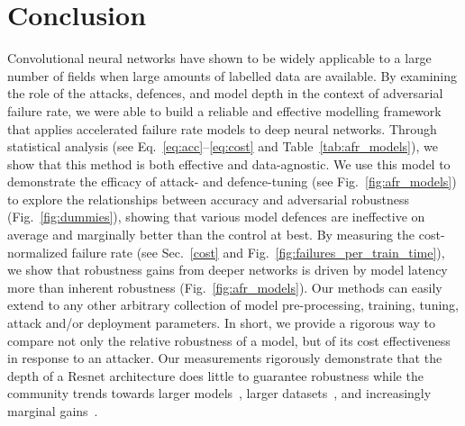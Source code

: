 \section{Conclusion}
Convolutional neural networks have shown to be widely applicable to a large number of fields when large amounts of labelled data are available. By examining the role of the attacks, defences, and model depth in the context of adversarial failure rate, we were able to build a reliable and effective modelling framework that applies accelerated failure rate models to deep neural networks. Through statistical analysis (see Eq.~\ref{eq:acc}--\ref{eq:cost} and Table~\ref{tab:afr_models}), we show that this method is both effective and data-agnostic.  We use this model to demonstrate the efficacy of attack- and defence-tuning (see Fig.~\ref{fig:afr_models}) to  explore the relationships between accuracy and adversarial robustness (Fig.~\ref{fig:dummies}), showing that various model defences are ineffective on average and marginally better than the control at best.
By measuring the cost-normalized failure rate (see Sec.~\ref{cost} and Fig.~\ref{fig:failures_per_train_time}), we show that robustness gains from deeper networks is driven by model latency more than inherent robustness (Fig.~\ref{fig:afr_models}). Our methods can easily extend to any other arbitrary collection of model pre-processing, training, tuning, attack and/or deployment parameters. In short, we provide a rigorous way to compare not only the relative robustness of a model, but of its cost effectiveness in response to an attacker. Our measurements rigorously demonstrate  that the depth of a Resnet architecture does little to guarantee robustness while the community trends towards larger models~\cite{desislavov2021compute}, larger datasets~\cite{desislavov2021compute,bailly2022effects}, and increasingly marginal gains~\cite{sun2017revisiting}.
